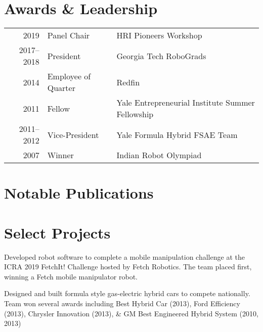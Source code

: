 \documentclass[]{deedy-resume}
\begin{document}
\begin{minipage}[t]{0.66\textwidth}

\section{Awards \& Leadership}
\begin{tabular}{rll}
2019 & Panel Chair & HRI Pioneers Workshop \\
2017--2018 & President & Georgia Tech RoboGrads \\
2014 & Employee of Quarter & Redfin \\
2011 & Fellow & Yale Entrepreneurial Institute Summer Fellowship \\
2011--2012 & Vice-President & Yale Formula Hybrid FSAE Team \\
2007 & Winner & Indian Robot Olympiad
\end{tabular}
\sectionsep


\section{Notable Publications}
\renewcommand\refname{\vskip -0.8cm} %


\nocite{*}


\section{Select Projects}
Developed robot software to complete a mobile manipulation challenge at the ICRA 2019 FetchIt! Challenge hosted by Fetch Robotics. The team placed first, winning a Fetch mobile manipulator robot.
\sectionsep

Designed and built formula style gas-electric hybrid cars to compete nationally. Team won several awards including Best Hybrid Car (2013), Ford Efficiency (2013), Chrysler Innovation (2013), \& GM Best Engineered Hybrid System (2010, 2013)
\sectionsep

\end{minipage}
\end{document}
